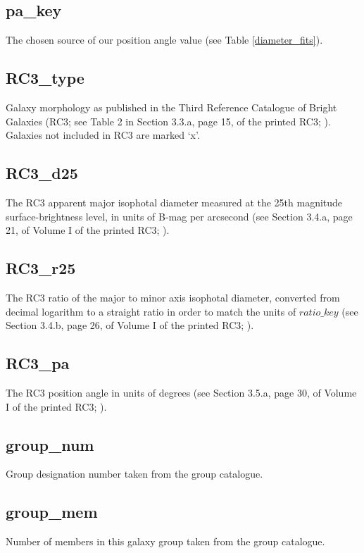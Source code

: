 \documentclass[twocolumn,tighten]{aastex62}
\begin{document}
\subsection{pa\_key} \label{pa_key}
The chosen source of our position angle value (see Table \ref{diameter_fits}).

\subsection{RC3\_type} \label{RC3_type}
Galaxy morphology as published in the Third Reference Catalogue of Bright Galaxies (RC3; see Table 2 in Section 3.3.a, page 15, of the printed RC3; \citealt{RC3}). Galaxies not included in RC3 are marked `x'.

\subsection{RC3\_d25} \label{RC3_d25}
The RC3 apparent major isophotal diameter measured at the 25th magnitude surface-brightness level, in units of B-mag per arcsecond (see Section 3.4.a, page 21, of Volume I of the printed RC3; \citealt{RC3}).

\subsection{RC3\_r25} \label{RC3_r25}
The RC3 ratio of the major to minor axis isophotal diameter, converted from decimal logarithm to a straight ratio in order to match the units of $ratio\_key$ (see Section 3.4.b, page 26, of Volume I of the printed RC3; \citealt{RC3}).

\subsection{RC3\_pa} \label{RC3_pa}
The RC3 position angle in units of degrees (see Section 3.5.a, page 30, of Volume I of the printed RC3; \citealt{RC3}).

\subsection{group\_num} \label{group_num}
Group designation number taken from the \cite{tully2015} group catalogue.

\subsection{group\_mem} \label{group_mem}
Number of members in this galaxy group taken from the \cite{tully2015} group catalogue.
\end{document}
